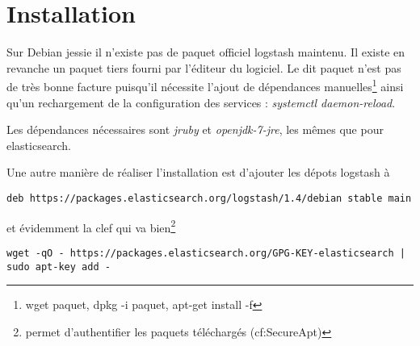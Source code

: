 \section{Installation}
%
%
%
%
%
%
%
%
%




Sur Debian jessie il n'existe pas de paquet officiel logstash maintenu. Il existe 
en revanche un paquet tiers
fourni par l'éditeur du logiciel. Le dit paquet n'est pas de très bonne facture  
puisqu'il nécessite l'ajout de dépendances manuelles\footnote{wget paquet, 
dpkg -i paquet, apt-get install -f} ainsi qu'un rechargement de 
la configuration des services : \emph{systemctl daemon-reload}.

Les dépendances nécessaires sont \emph{jruby} et \emph{openjdk-7-jre}, les mêmes 
que pour elasticsearch.

Une autre manière de réaliser l'installation est d'ajouter les dépots logstash à 

\begin{lstlisting}[style=code,label={lst:ajoutdepotlogstash}]
deb https://packages.elasticsearch.org/logstash/1.4/debian stable main
\end{lstlisting}

et évidemment la clef qui va bien\footnote{permet d'authentifier les paquets téléchargés
(cf:SecureApt)}

\begin{lstlisting}[style=code,label={lst:ajoutclefdepotlogstash}]
wget -qO - https://packages.elasticsearch.org/GPG-KEY-elasticsearch | sudo apt-key add -
\end{lstlisting}

